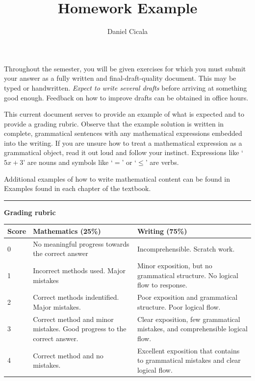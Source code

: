 \documentclass{amsart}
\author{Daniel Cicala}
\title{Homework Example}
\begin{document}
\maketitle{}

Throughout the semester, you will be given exercises for
which you must submit your answer as a fully written and
final-draft-quality document.  This may be typed or
handwritten. \emph{Expect to write several drafts} before
arriving at something good enough. Feedback on how to
improve drafts can be obtained in office hours.

This current document serves to provide an example of what
is expected and to provide a grading rubric. Observe that
the example solution is written in complete, grammatical
sentences with any mathematical expressions embedded into
the writing.  If you are unsure how to treat a mathematical
expression as a grammatical object, read it out loud and
follow your instinct.  Expressions like `$ 5x+3 $' are nouns
and symbols like `$ = $' or `$ \leq $' are verbs.

Additional examples of how to write mathematical content can
be found in Examples found in each chapter of the textbook.

\vfill
\noindent\rule{\textwidth}{1pt}
\vfill

\textbf{Grading rubric}

\begin{center}
  \begin{tabular}{|l|p{5cm}|p{5cm}|}
    \hline
    \rowcolor{cyan!30}
    \textbf{Score}
    & \textbf{Mathematics (25\%)}
    & \textbf{Writing (75\%)}
    \\
    \hline
    0
          & No meaningful progress towards the correct answer
                        & Incomprehensible. Scratch work.\\
    \rowcolor{cyan!15}
    1
          & Incorrect methods used. Major mistakes
                        & Minor exposition, but no grammatical structure. No
        logical flow to response. \\
    2
          & Correct methods indentified. Major mistakes.
                        & Poor exposition and grammatical structure. Poor
        logical flow. \\
    \rowcolor{cyan!15}
    3
          & Correct method and minor mistakes. Good progress to
      the correct answer.
                        & Clear exposition, few grammatical mistakes, and
        comprehensible logical flow. \\
    4
          & Correct method and no mistakes.
                        & Excellent exposition that contains to grammatical
        mistakes and clear logical flow.\\
    \hline                          
  \end{tabular}
\end{center}
\end{document}
